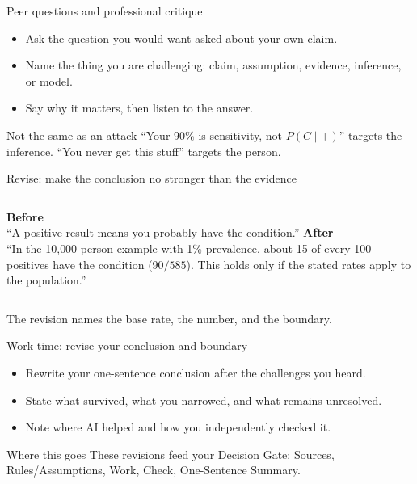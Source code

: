 \documentclass[aspectratio=169,10pt]{beamer}
\begin{document}
\begin{frame}{Peer questions and professional critique}
\begin{itemize}
\item Ask the question you would want asked about your own claim.
\item Name the thing you are challenging: claim, assumption, evidence, inference, or model.
\item Say why it matters, then listen to the answer.
\end{itemize}
\vspace{2mm}
\begin{alertblock}{Not the same as an attack}
``Your 90\% is sensitivity, not $P(C\mid +)$'' targets the inference. ``You never get this stuff'' targets the person.
\end{alertblock}
\end{frame}

\begin{frame}{Revise: make the conclusion no stronger than the evidence}
\begin{columns}[T]
\textbf{Before}\\[1mm]
``A positive result means you probably have the condition.''
\textbf{After}\\[1mm]
``In the 10{,}000-person example with 1\% prevalence, about 15 of every 100 positives have the condition ($90/585$). This holds only if the stated rates apply to the population.''
\end{columns}
\vspace{3mm}
\small The revision names the base rate, the number, and the boundary.
\end{frame}

\begin{frame}{Work time: revise your conclusion and boundary}
\begin{itemize}
\item Rewrite your one-sentence conclusion after the challenges you heard.
\item State what survived, what you narrowed, and what remains unresolved.
\item Note where AI helped and how you independently checked it.
\end{itemize}
\vspace{2mm}
\begin{block}{Where this goes}
These revisions feed your Decision Gate: Sources, Rules/Assumptions, Work, Check, One-Sentence Summary.
\end{block}
\end{frame}
\end{document}

